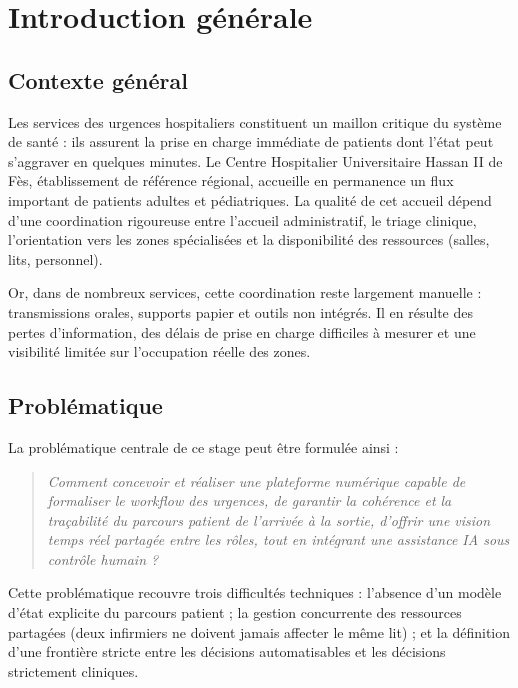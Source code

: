 \chapter*{Introduction générale}

\section{Contexte général}

Les services des urgences hospitaliers constituent un maillon critique du système de santé : ils assurent la prise en charge immédiate de patients dont l'état peut s'aggraver en quelques minutes. Le Centre Hospitalier Universitaire Hassan II de Fès, établissement de référence régional, accueille en permanence un flux important de patients adultes et pédiatriques. La qualité de cet accueil dépend d'une coordination rigoureuse entre l'accueil administratif, le triage clinique, l'orientation vers les zones spécialisées et la disponibilité des ressources (salles, lits, personnel).

Or, dans de nombreux services, cette coordination reste largement manuelle : transmissions orales, supports papier et outils non intégrés. Il en résulte des pertes d'information, des délais de prise en charge difficiles à mesurer et une visibilité limitée sur l'occupation réelle des zones.

\section{Problématique}

La problématique centrale de ce stage peut être formulée ainsi :

\begin{quote}
\textit{Comment concevoir et réaliser une plateforme numérique capable de formaliser le workflow des urgences, de garantir la cohérence et la traçabilité du parcours patient de l'arrivée à la sortie, d'offrir une vision temps réel partagée entre les rôles, tout en intégrant une assistance IA sous contrôle humain ?}
\end{quote}

Cette problématique recouvre trois difficultés techniques : l'absence d'un modèle d'état explicite du parcours patient ; la gestion concurrente des ressources partagées (deux infirmiers ne doivent jamais affecter le même lit) ; et la définition d'une frontière stricte entre les décisions automatisables et les décisions strictement cliniques.


